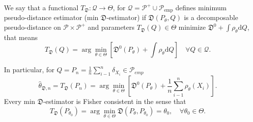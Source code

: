 {\begin{definition}
	We say that a functional $T_\mathfrak{D}:\mathcal{Q} \rightarrow \Theta$, for $\mathcal{Q}=\mathcal{P}^+ \cup \mathcal{P}_{\text{emp}}$	defines minimum pseudo-distance estimator (min $\mathfrak{D}$-estimator) if $\mathfrak{D}(P_\theta,Q)$ is a decomposable pseudo-distance on $\mathcal{P}\times\mathcal{P}^+$ and parameters $T_\mathfrak{D}(Q) \in \Theta$ minimize $\mathfrak{D}^0 + \int{\rho_\theta}\mathrm{d}Q$, that means
	\begin{equation}
		T_\mathfrak{D}(Q) = \arg\min_{\theta \in \Theta} \left[ \mathfrak{D}^0(P_\theta) + \int{\rho_\theta}\mathrm{d}Q \right] \quad \forall Q \in \mathcal{Q}.
	\end{equation}
\end{definition}
In particular, for $Q = P_n = \frac{1}{n}\sum_{i-1}^n \delta_{X_i} \in \mathcal{P}_{emp}$
\begin{equation}
	\hat{\theta}_{\mathfrak{D},n} =T_\mathfrak{D}(P_n)  = \arg\min_{\theta \in \Theta}\left[ \mathfrak{D}^0(P_\theta) + \dfrac{1}{n} \sum_{i-1}^n \rho_\theta (X_i) \right].
\end{equation}
Every min $\mathfrak{D}$-estimator is Fisher consistent in the sense that
\begin{equation}
	T_\mathfrak{D}(P_{\theta_0}) = \arg\min_{\theta \in \Theta} \mathfrak{D}(P_\theta, P_{\theta_0}) = \theta_0,\quad \forall \theta_0 \in \Theta.
\end{equation}

}
